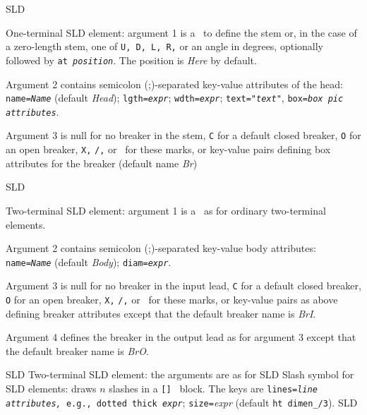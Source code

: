   {SLD}
  {One-terminal SLD element: argument 1 is a \linespec\ to define the stem
   or, in the case of a zero-length stem, one of {\tt U, D, L, R,} or an
   angle in degrees, optionally followed by {\tt at {\sl position}}.
   The position is {\sl Here} by default.

   Argument 2 contains semicolon (;)-separated key-value attributes
   of the head:
   {\tt name={\sl{}Name}} (default {\sl Head});
   {\tt lgth={\sl{}expr}};
   {\tt wdth={\sl{}expr}};
   {\tt text="{\sl{}text}"},
   {\tt box={\sl{}box pic attributes}}.

   Argument 3 is null for no breaker in the stem, {\tt C} for a default
   closed breaker, {\tt O} for an open breaker, {\tt X,} {\tt /,} or \bsl\ for
   these marks, or
   key-value pairs defining box attributes for the breaker
   (default name {\sl Br})
   }
  {SLD}
  {Two-terminal SLD element: argument 1 is a \linespec\ as for ordinary
   two-terminal elements.

   Argument 2 contains semicolon (;)-separated key-value body attributes:
   {\tt name={\sl{}Name}} (default {\sl Body});
   {\tt diam={\sl{}expr}}.

   Argument 3 is null for no breaker in the input lead, {\tt C} for a default
   closed breaker, {\tt O} for an open breaker, {\tt X,} {\tt /,} or \bsl\ for
   these marks, or
   key-value pairs as above defining breaker attributes
   except that the default breaker name is {\sl BrI}.

   Argument 4 defines the breaker in the output lead as for argument 3
   except that the default breaker name is {\sl BrO}.
   }
  {SLD}
  {Two-terminal SLD element: the arguments are as for 
   }
  {SLD}
  {Slash symbol for SLD elements: draws $n$ slashes in a {\tt [] } block.
   The keys are
   {\tt lines={\sl line attributes,} e.g., dotted thick {\sl expr}};
   {\tt size=}{\sl expr} (default {\tt ht dimen\_/3}).
   }
%
  {SLD}

